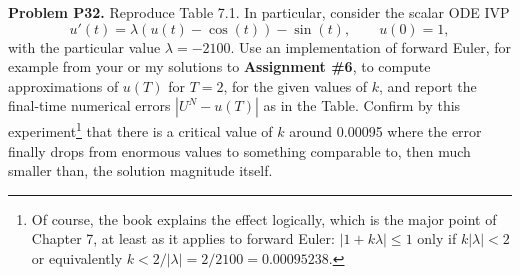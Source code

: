 \documentclass[12pt]{amsart}
\newcommand{\prob}[1]{\bigskip\noindent\textbf{#1}\quad }
\newcommand{\epart}[1]{\medskip\noindent\textbf{#1)}\quad }
\begin{document}
\prob{Problem P32.}  Reproduce Table 7.1.  In particular, consider the scalar ODE IVP
	$$u'(t) = \lambda \left( u(t) - \cos(t) \right) - \sin(t), \qquad u(0)=1,$$
with the particular value $\lambda=-2100$.  Use an implementation of forward Euler, for example from your or my solutions to \textbf{Assignment \#6}, to compute approximations of $u(T)$ for $T=2$, for the given values of $k$, and report the final-time numerical errors $|U^N - u(T)|$ as in the Table.  Confirm by this experiment\footnote{Of course, the book explains the effect logically, which is the major point of Chapter 7, at least as it applies to forward Euler: $|1+k\lambda| \le 1$ only if $k|\lambda|<2$ or equivalently $k < 2/|\lambda| = 2/2100 = 0.00095238$.} that there is a critical value of $k$ around 0.00095 where the error finally drops from enormous values to something comparable to, then much smaller than, the solution magnitude itself.



\begin{comment} MOVE THE FOLLOWING TO A8 or A8
\prob{Problem PYY.}  Subsection 5.9.4 explains why the explicit trapezoid rule (5.53) is sometimes called a \emph{predictor-corrector} method.  A full Euler step is used to estimate (``predict'') the new solution value, and then a formerly-implicit method, the original trapezoid method, is used to actually take the step, which ``corrects'' the prediction.  This problem attempts to construct a predictor-corrector method with higher order.

\epart{a}  On page 132 (section 5.9) there is a list of explicit Adams-Bashforth and implicit Adams-Moulton multistep methods.  Suppose we cut a step into two parts, with stage steps $k/2$.  From $U^n$ suppose we take a  forward Euler step of length $k/2$ to give $U^*$ at $t_n+k/2$.  Then we use $U^n$ and $U^*$ in the second-order (``2-step'') Adams-Bashforth scheme to give $U^\dagger$ at $t_n+k=t_{n+1}$.  The value $U^\dagger$ is the predicted value at $t_{n+1}$.  Then we use the second-order (``2-step'') Adams-Moulton scheme, using known values $U^n,U^*,U^\dagger$ on the right-hand side, as the corrector to give $U^{n+1}$.  Write down these formulas.  (You don't need to implement this scheme, but your formulas should make it clear how to do so.)

\epart{b}  The scheme you constructed in part \textbf{(a)} is a one-step, multi-stage Runge-Kutta scheme.  Write down its Butcher tableau.  (\emph{Hint.}  Be careful!  You really can write the scheme in form (5.34), where $Y_1=U^n$, $Y_2=U^*$, $Y_3=U^\dagger$.)

\epart{c}  Following what is described at the beginning of section 7.6.2, apply the scheme in part \textbf{(a)} to the test equation $u'=\lambda u$ and write the scheme as $U^{n+1} = R(z) U^n$ for $z=\lambda k$.  What is $R(z)$?  From the form of $R(z)$, what is the order of the truncation error?  (That is, what is $p$ in $\tau=O(k^p)$?)  Would you recommend this method?

\epart{d} Generate a plot of the stability region of the method; see the advice in section 7.6.2 on how to do this.
\end{comment}
\end{document}
